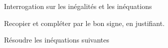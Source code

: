 \documentclass[12pt,addpoints]{exam}
\begin{document}
\begin{center}
    \Huge{Interrogation sur les inégalités et les inéquations}
\end{center}

\begin{questions}

\question[3] Recopier et compléter par le bon signe, en justifiant.
\vspace{-0.5cm}
\begin{multicols}{3}
\end{multicols}

\question[4] Résoudre les inéquations suivantes
\begin{multicols}{2}
\end{multicols}
\end{questions}
\end{document}
